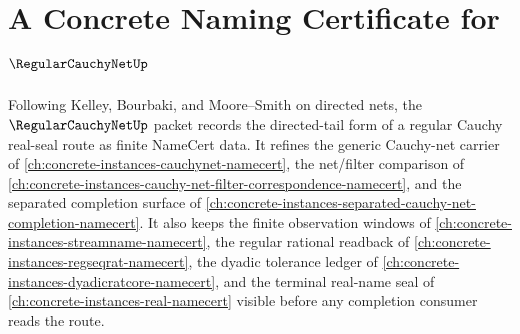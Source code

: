 \chapter{A Concrete Naming Certificate for $\RegularCauchyNetUp$}
\label{ch:concrete-instances-regular-cauchy-net-namecert}

Following Kelley, Bourbaki, and Moore--Smith on directed nets, the $\RegularCauchyNetUp$ packet records the directed-tail form of a regular Cauchy real-seal route as finite NameCert data. It refines the generic Cauchy-net carrier of \autoref{ch:concrete-instances-cauchynet-namecert}, the net/filter comparison of \autoref{ch:concrete-instances-cauchy-net-filter-correspondence-namecert}, and the separated completion surface of \autoref{ch:concrete-instances-separated-cauchy-net-completion-namecert}. It also keeps the finite observation windows of \autoref{ch:concrete-instances-streamname-namecert}, the regular rational readback of \autoref{ch:concrete-instances-regseqrat-namecert}, the dyadic tolerance ledger of \autoref{ch:concrete-instances-dyadicratcore-namecert}, and the terminal real-name seal of \autoref{ch:concrete-instances-real-namecert} visible before any completion consumer reads the route.

